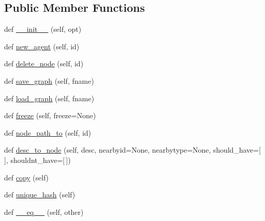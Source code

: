 \subsection*{Public Member Functions}
\begin{DoxyCompactItemize}
\item 
def \hyperlink{classprojects_1_1mastering__the__dungeon_1_1tasks_1_1graph__world2_1_1graph_1_1Graph_ab78f8e7e877bd4aef992c075fcbd13d1}{\+\_\+\+\_\+init\+\_\+\+\_\+} (self, opt)
\item 
def \hyperlink{classprojects_1_1mastering__the__dungeon_1_1tasks_1_1graph__world2_1_1graph_1_1Graph_a201d7b1a9a28cc8f3790f88eb3b7479a}{new\+\_\+agent} (self, id)
\item 
def \hyperlink{classprojects_1_1mastering__the__dungeon_1_1tasks_1_1graph__world2_1_1graph_1_1Graph_a91d58a8f0c4d19648c0a91967a7c9f4a}{delete\+\_\+node} (self, id)
\item 
def \hyperlink{classprojects_1_1mastering__the__dungeon_1_1tasks_1_1graph__world2_1_1graph_1_1Graph_a605d2a67ebf1d4336f15a0d2a0bf230c}{save\+\_\+graph} (self, fname)
\item 
def \hyperlink{classprojects_1_1mastering__the__dungeon_1_1tasks_1_1graph__world2_1_1graph_1_1Graph_a95dd7298b5df701a35be0a65552483f3}{load\+\_\+graph} (self, fname)
\item 
def \hyperlink{classprojects_1_1mastering__the__dungeon_1_1tasks_1_1graph__world2_1_1graph_1_1Graph_acc0a17702ba44719283709176a354d47}{freeze} (self, freeze=None)
\item 
def \hyperlink{classprojects_1_1mastering__the__dungeon_1_1tasks_1_1graph__world2_1_1graph_1_1Graph_a81d2f214566e08e4ddc4414c4284fbe4}{node\+\_\+path\+\_\+to} (self, id)
\item 
def \hyperlink{classprojects_1_1mastering__the__dungeon_1_1tasks_1_1graph__world2_1_1graph_1_1Graph_a42fff07b3f21289c9b360adf0d37d231}{desc\+\_\+to\+\_\+node} (self, desc, nearbyid=None, nearbytype=None, should\+\_\+have=\mbox{[}$\,$\mbox{]}, shouldnt\+\_\+have=\mbox{[}$\,$\mbox{]})
\item 
def \hyperlink{classprojects_1_1mastering__the__dungeon_1_1tasks_1_1graph__world2_1_1graph_1_1Graph_aa5f7e25bb9caf56472851221896c985f}{copy} (self)
\item 
def \hyperlink{classprojects_1_1mastering__the__dungeon_1_1tasks_1_1graph__world2_1_1graph_1_1Graph_a4f83fec0576a592cb25b47ea826a809a}{unique\+\_\+hash} (self)
\item 
def \hyperlink{classprojects_1_1mastering__the__dungeon_1_1tasks_1_1graph__world2_1_1graph_1_1Graph_a4672233fe36f6c3c96ef7003bc01cb29}{\+\_\+\+\_\+eq\+\_\+\+\_\+} (self, other)

\end{DoxyCompactItemize}
